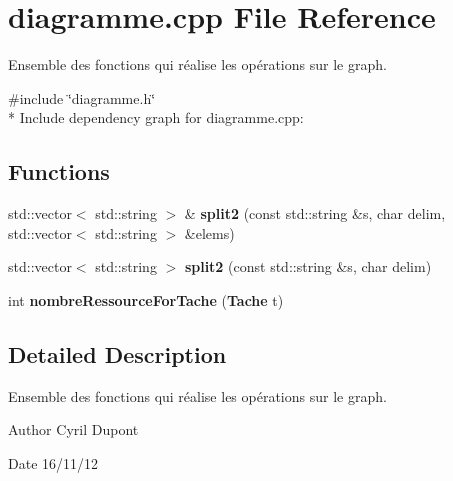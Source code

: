\section{diagramme.\-cpp File Reference}
\label{diagramme_8cpp}


Ensemble des fonctions qui réalise les opérations sur le graph.  


{\ttfamily \#include \char`\"{}diagramme.\-h\char`\"{}}\\*
Include dependency graph for diagramme.\-cpp\-:
\subsection*{Functions}
\begin{DoxyCompactItemize}
\item 
std\-::vector$<$ std\-::string $>$ \& {\bfseries split2} (const std\-::string \&s, char delim, std\-::vector$<$ std\-::string $>$ \&elems)\label{diagramme_8cpp_a984a185cafd271e01b16920ecdde3366}

\item 
std\-::vector$<$ std\-::string $>$ {\bfseries split2} (const std\-::string \&s, char delim)\label{diagramme_8cpp_a4772f054f0359f307bd2dc73f679439b}

\item 
int {\bfseries nombre\-Ressource\-For\-Tache} ({\bf Tache} t)\label{diagramme_8cpp_a79ddf9c32ba0e75bcaa4b9126aa1f4a8}

\end{DoxyCompactItemize}


\subsection{Detailed Description}
Ensemble des fonctions qui réalise les opérations sur le graph. \begin{DoxyAuthor}{Author}
Cyril Dupont 
\end{DoxyAuthor}
\begin{DoxyDate}{Date}
16/11/12 
\end{DoxyDate}
